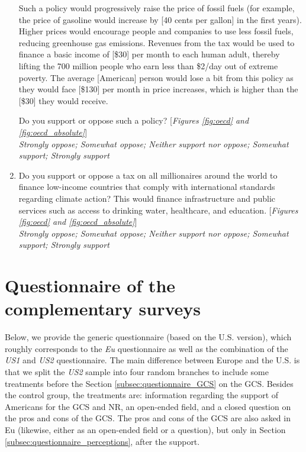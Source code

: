 \documentclass[12pt,english]{article}
\begin{document}
\begin{enumerate}
Such a policy would progressively raise the price of fossil fuels (for example, the price of gasoline would increase by [40 cents per gallon] in the first years). Higher prices would encourage people and companies to use less fossil fuels, reducing greenhouse gas emissions. Revenues from the tax would be used to finance a basic income of [\$30] per month to each human adult, thereby lifting the 700 million people who earn less than \$2/day out of extreme poverty. 
The average [American] person would lose a bit from this policy as they would face [\$130] per month in price increases, which is higher than the [\$30] they would receive.

Do you support or oppose such a policy?  [\textit{Figures \ref{fig:oecd} and \ref{fig:oecd_absolute}}]
\\ \textit{Strongly oppose; Somewhat oppose; Neither support nor oppose; Somewhat support; Strongly support}
\item \label{q:millionaire_tax} Do you support or oppose a tax on all millionaires around the world to finance low-income countries that comply with international standards regarding climate action? 
This would finance infrastructure and public services such as access to drinking water, healthcare, and education. [\textit{Figures \ref{fig:oecd} and \ref{fig:oecd_absolute}}]
\\ \textit{Strongly oppose; Somewhat oppose; Neither support nor oppose; Somewhat support; Strongly support}
\end{enumerate}



\renewcommand{\theenumi}{\arabic{enumi}}
\clearpage
\section{Questionnaire of the complementary surveys}\label{app:questionnaire}
Below, we provide the generic questionnaire (based on the U.S. version), which roughly corresponds to the \textit{Eu} questionnaire as well as the combination of the \textit{US1} and \textit{US2} questionnaire. The main difference between Europe and the U.S. is that we split the \textit{US2} sample into four random branches to include some treatments before the Section \ref{subsec:questionnaire_GCS} on the GCS. Besides the control group, the treatments are: information regarding the support of Americans for the GCS and NR, an open-ended field, and a closed question on the pros and cons of the GCS. The pros and cons of the GCS are also asked in Eu (likewise, either as an open-ended field or a question), but only in Section \ref{subsec:questionnaire_perceptions}, after the support. 
\end{document}
